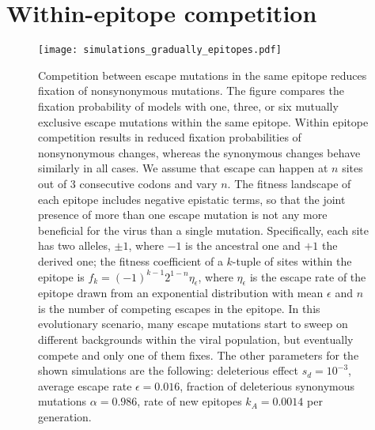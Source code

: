 \newpage
\section{Within-epitope competition}
\begin{figure}[!ht]
\begin{center}
\texttt{[image: simulations\_gradually\_epitopes.pdf]}
\caption{
Competition between escape mutations in the same epitope reduces fixation of
nonsynonymous mutations. The figure compares the fixation probability of models
with one, three, or six mutually exclusive escape mutations within the
same epitope. Within epitope competition results in reduced fixation
probabilities of nonsynonymous changes, whereas the synonymous changes behave 
similarly in all cases. We assume that escape can happen at $n$ sites out of 3
consecutive codons and vary $n$.
The fitness landscape of each epitope includes negative epistatic terms, so that
the joint presence of more than one escape mutation is not any more beneficial
for the virus than a single mutation. Specifically, each site has two alleles,
$\pm 1$, where $-1$ is the ancestral one and $+1$ the derived one; the fitness
coefficient of a $k$-tuple of sites within the epitope is $f_k = (-1)^{k-1}
2^{1-n}\eta_\epsilon $, where $\eta_\epsilon$ is the escape rate of the epitope
drawn from an exponential distribution with mean $\epsilon$ and 
$n$ is the number of competing escapes in the epitope. 
In this evolutionary scenario, many escape mutations start to sweep on different backgrounds within the viral population, but eventually
compete and only one of them fixes. The other parameters for the shown simulations are
the following: deleterious effect $s_d = 10^{-3}$, average escape rate $\epsilon = 0.016$,
fraction of deleterious synonymous mutations $\alpha = 0.986$, rate of new epitopes
$k_A=0.0014$ per generation.
}
\label{fig:wec}
\end{center}
\end{figure}
